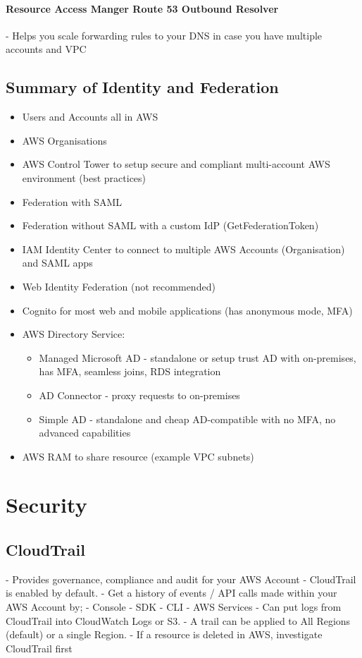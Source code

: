 \documentclass[11pt]{book}
\begin{document}
    \subsubsection{Resource Access Manger Route 53 Outbound Resolver}
    - Helps you scale forwarding rules to your DNS in case you have multiple accounts and VPC


    \section{Summary of Identity and Federation}

    \begin{itemize}
        \item Users and Accounts all in AWS
        \item AWS Organisations
        \item AWS Control Tower to setup secure and compliant multi-account AWS environment (best practices)
        \item Federation with SAML
        \item Federation without SAML with a custom IdP (GetFederationToken)
        \item IAM Identity Center to connect to multiple AWS Accounts (Organisation) and SAML apps
        \item Web Identity Federation (not recommended)
        \item Cognito for most web and mobile applications (has anonymous mode, MFA)
        \item AWS Directory Service:
        \begin{itemize}
            \item Managed Microsoft AD - standalone or setup trust AD with on-premises, has MFA, seamless joins, RDS integration
            \item AD Connector - proxy requests to on-premises
            \item Simple AD - standalone and cheap AD-compatible with no MFA, no advanced capabilities
        \end{itemize}
        \item AWS RAM to share resource (example VPC subnets)
    \end{itemize}


    \chapter{Security}

    \section{CloudTrail}
    - Provides governance, compliance and audit for your AWS Account
    - CloudTrail is enabled by default.
    - Get a history of events / API calls made within your AWS Account by;
        - Console
        - SDK
        - CLI
        - AWS Services
    - Can put logs from CloudTrail into CloudWatch Logs or S3.
    - A trail can be applied to All Regions (default) or a single Region.
    - If a resource is deleted in AWS, investigate CloudTrail first
\end{document}
